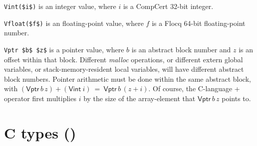 \documentclass[12pt,fleqn,openany,oneside,showtrims]{memoir}
\newcommand{\ychapter}[2]{\chapter[#1]{#1 \hfill \normalsize #2}}
\begin{document}
\lstinline{Vint($i$)} is an integer value,
where $i$ is a CompCert 32-bit integer.

\lstinline{Vfloat($f$)} is an floating-point value,
where $f$ is a Flocq 64-bit floating-point number.

\lstinline{Vptr $b$ $z$} is a pointer value,
where $b$ is an abstract block number and $z$ is an offset
within that block.  Different \emph{malloc} operations,
or different extern global variables, or 
stack-memory-resident local variables,
will have different abstract block numbers.
Pointer arithmetic must be done within the same abstract block,
with $(\mathsf{Vptr}\,b\,z)+(\mathsf{Vint}~i)~=~\mathsf{Vptr}\,b\,(z+i)$.
Of course, the C-language + operator first multiplies $i$
by the size of the array-element that 
$\mathsf{Vptr}\,b\,z$ points to.

\ychapter{C types}{()}
\end{document}
